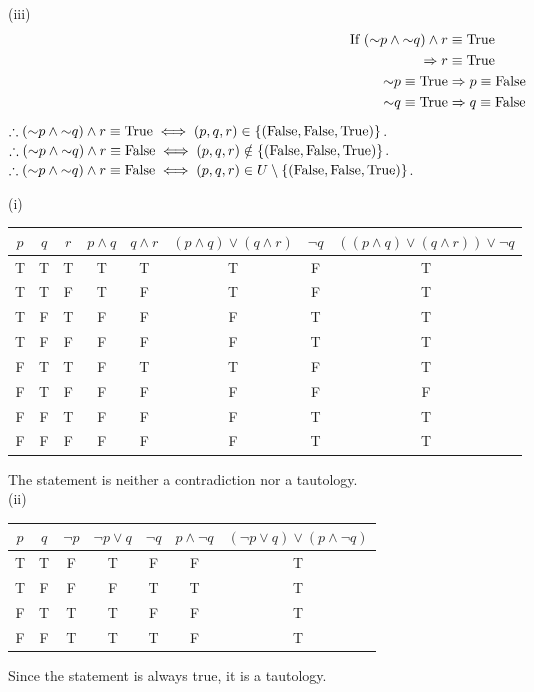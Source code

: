 \documentclass{report}
\begin{document}
\sol (iii) \begin{align*}
	\text{If } (\mathord{\sim} p \land \mathord{\sim} q) \land r &\equiv \text{True} \\
	\Rightarrow r &\equiv \text{True} \\
	\mathord{\sim} p \equiv \text{True} &\Rightarrow p \equiv\text{False} \\
	\mathord{\sim} q \equiv \text{True} &\Rightarrow q \equiv\text{False}
\end{align*}
$\therefore(\mathord{\sim} p \land \mathord{\sim} q) \land r \equiv \text{True} \iff (p,q,r)\in\left\lbrace (\text{False},\text{False},\text{True}) \right\rbrace$. \\
$\therefore(\mathord{\sim} p \land \mathord{\sim} q) \land r \equiv \text{False} \iff (p,q,r)\notin\left\lbrace (\text{False},\text{False},\text{True}) \right\rbrace$. \\
$\therefore(\mathord{\sim} p \land \mathord{\sim} q) \land r \equiv \text{False} \iff (p,q,r)\in U \setminus \left\lbrace (\text{False},\text{False},\text{True}) \right\rbrace$. 

\sol (i)
\begin{center}
	\begin{tabular}{|ccc||cc||cc||c|}
		\hline 
		$p$ & $q$ & $r$ & $p\land q$ & $q\land r$ & $(p\land q)\lor(q\land r)$ & $\lnot q$ & $((p\land q)\lor(q\land r))\lor\lnot q$ \\ \hline
		T	& T	& T	& T	& T	& T	& F	&	T \\
		T	& T	&	F & T	& F	& T	& F	&	T \\
		T	& F	&	T & F	& F	& F	& T	&	T \\
		T	& F	&	F & F	& F	& F	& T	&	T \\
		F	& T	&	T & F	& T	& T	& F	&	T \\
		F	& T	&	F & F	& F	& F	& F	&	F \\
		F	& F	&	T & F	& F	& F	& T	&	T \\
		F	& F	&	F & F	& F	& F	& T	&	T \\ \hline 
	\end{tabular}
\end{center}
The statement is neither a contradiction nor a tautology. \\

\sol (ii)
\begin{center}
	\begin{tabular}{|cc||cc||cc||c|}
		\hline 
		$p$ & $q$ & $\lnot p$ & $\lnot p \lor q$ & $\lnot q$ & $p\land\lnot q$ & $(\lnot p\lor q) \lor (p\land\lnot q)$ \\ \hline
		T	& T	& F	& T	& F	& F	& T	\\
		T	& F &	F	& F	& T	& T	& T	\\
		F	& T &	T	& T	& F	& F	& T	\\
		F	& F &	T	& T	& T	& F	& T	\\ \hline 
	\end{tabular}
\end{center}
Since the statement is always true, it is a tautology.
\end{document}
